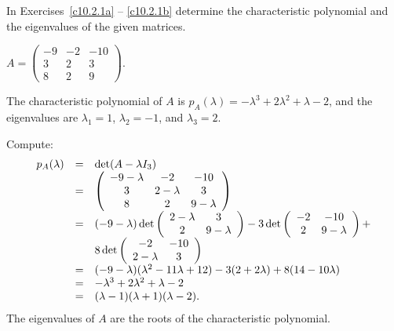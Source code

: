 \documentclass{ximera}
\begin{document}
\TEXER

\noindent In Exercises~\ref{c10.2.1a} -- \ref{c10.2.1b} determine the 
characteristic polynomial and the eigenvalues of the given matrices.
\begin{exercise} \label{c10.2.1a}
$A = \left(\begin{array}{rrr} -9 & -2 & -10 \\ 3 & 2 & 3 \\
8 & 2 & 9 \end{array}\right)$. 

\begin{solution}

\ans The characteristic polynomial of $A$ is $p_A(\lambda) =
-\lambda^3 + 2\lambda^2 + \lambda - 2$, and the eigenvalues are
$\lambda_1 = 1$, $\lambda_2 = -1$, and $\lambda_3 = 2$.

\soln Compute:
\[
\begin{array}{rcl}
p_A(\lambda) & = & \det(A - \lambda I_3) \\
& = & \left(\begin{array}{ccc} -9 - \lambda & -2 & -10 \\ 3 & 2 - \lambda & 3 \\ 8 & 2 & 9 - \lambda\end{array}\right) \\
& = & (-9 - \lambda)\det\left(\begin{array}{cc} 2 - \lambda & 3\\ 2 &9 - \lambda\end{array}\right)
- 3\det\left(\begin{array}{cc} -2 & -10\\ 2 &9 - \lambda\end{array}\right) + \\
& & 8\det\left(\begin{array}{cc} -2 & -10\\ 2 - \lambda &3\end{array}\right) \\
& = & (-9 - \lambda)(\lambda^2 - 11\lambda + 12)
- 3(2 + 2\lambda) + 8(14 - 10\lambda) \\
& = & -\lambda^3 + 2\lambda^2 + \lambda - 2 \\
& = & (\lambda - 1)(\lambda + 1)(\lambda - 2). \end{array}
\]
The eigenvalues of $A$ are the roots of the characteristic polynomial.

\end{solution}
\end{exercise}
\end{document}
